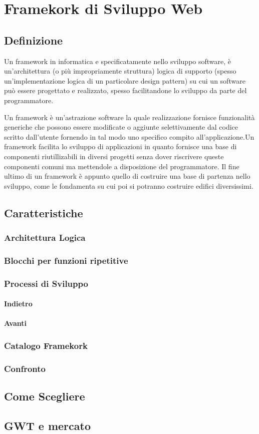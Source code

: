 \chapter{Framekork di Sviluppo Web}
\setcounter{secnumdepth}{5}
\setcounter{tocdepth}{5}

\section{Definizione}
Un framework in informatica e specificatamente nello sviluppo software, 
è un'architettura (o più impropriamente struttura) logica di supporto
(spesso un'implementazione logica di un particolare design pattern) su 
cui un software può essere progettato e realizzato, spesso facilitandone 
lo sviluppo da parte del programmatore.

Un framework è un'astrazione software la quale realizzazione fornisce funzionalità 
generiche che possono essere modificate o aggiunte selettivamente dal codice scritto 
dall'utente fornendo in tal modo uno specifico compito all'applicazione.Un framework
facilita lo sviluppo di applicazioni in quanto fornisce una base di 
componenti riutillizabili in diversi progetti senza dover riscrivere queste componenti
comuni ma mettendole a disposizione del programmatore.
Il fine ultimo di un framework è appunto quello di costruire una base di partenza nello 
sviluppo, come le fondamenta su cui poi si potranno costruire edifici diversissimi.

\section{Caratteristiche}
	  \subsection{Architettura Logica}
	  \subsection{Blocchi per funzioni ripetitive}
	  \subsection{Processi di Sviluppo}
		      \subsubsection{Indietro}
		      \subsubsection{Avanti}
	  \subsection{Catalogo Framekork}
	  \subsection{Confronto}
\section{Come Scegliere}
\section{GWT e mercato}
 
